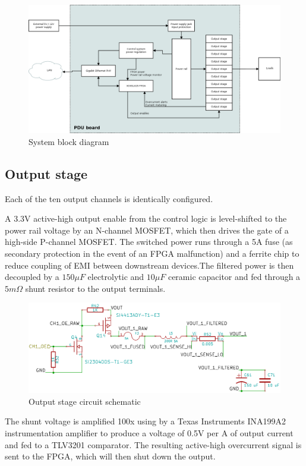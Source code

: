 \documentclass{article}
\begin{document}
\begin{figure}[h!]
\includegraphics[scale=0.25]{system-block.png}
\caption{System block diagram}
\label{system-block}
\end{figure}
\FloatBarrier

\subsection{Output stage}

Each of the ten output channels is identically configured.

A 3.3V active-high output enable from the control logic is level-shifted to the power rail voltage by an N-channel
MOSFET, which then drives the gate of a high-side P-channel MOSFET. The switched power runs through a 5A fuse (as 
secondary protection in the event of an FPGA malfunction) and a ferrite chip to reduce coupling of EMI between 
downstream devices.The filtered power is then decoupled by a $150 \mu F$ electrolytic and $10 \mu F$ ceramic 
capacitor and fed through a $5 m\Omega$ shunt resistor to the output terminals.

\begin{figure}[h!]
\includegraphics[scale=0.25]{output-stage-1.png}
\caption{Output stage circuit schematic}
\label{output-stage-1}
\end{figure}
\FloatBarrier

The shunt voltage is amplified 100x using by a Texas Instruments INA199A2 instrumentation amplifier to produce a 
voltage of 0.5V per A of output current and fed to a TLV3201 comparator. The resulting active-high overcurrent signal 
is sent to the FPGA, which will then shut down the output.
\end{document}
